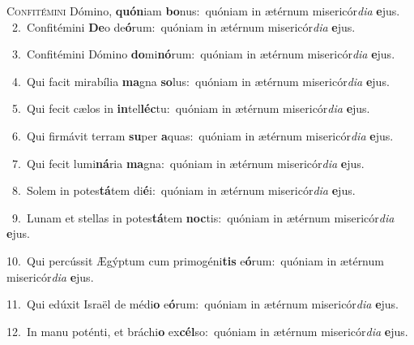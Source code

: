 \lettrine{\initial\textcolor{\initialcolor}{C}}{onfitémini} Dómino, \textbf{quón}\-iam \textbf{bo}\-nus:~\star quóniam in ætérnum misericór\-\textit{di}\-\textit{a} \textbf{e}\-jus.\\
{\numbfont\textcolor{\numbcolor}{~2.}}~Confitémini \textbf{De}\-o de\-\textbf{ó}\-rum:~\star quóniam in ætérnum misericór\-\textit{di}\-\textit{a} \textbf{e}\-jus.\par
{\numbfont\textcolor{\numbcolor}{~3.}}~Confitémini Dómino \textbf{do}\-mi\-\textbf{nó}\-rum:~\star quóniam in ætérnum misericór\-\textit{di}\-\textit{a} \textbf{e}\-jus.\par
{\numbfont\textcolor{\numbcolor}{~4.}}~Qui facit mirabília \textbf{ma}\-gna \textbf{so}\-lus:~\star quóniam in ætérnum misericór\-\textit{di}\-\textit{a} \textbf{e}\-jus.\par
{\numbfont\textcolor{\numbcolor}{~5.}}~Qui fecit cælos in \textbf{in}\-tel\-\textbf{léc}\-tu:~\star quóniam in ætérnum misericór\-\textit{di}\-\textit{a} \textbf{e}\-jus.\par
{\numbfont\textcolor{\numbcolor}{~6.}}~Qui firmávit terram \textbf{su}\-per \textbf{a}\-quas:~\star quóniam in ætérnum misericór\-\textit{di}\-\textit{a} \textbf{e}\-jus.\par
{\numbfont\textcolor{\numbcolor}{~7.}}~Qui fecit lumi\-\textbf{ná}\-ria \textbf{ma}\-gna:~\star quóniam in ætérnum misericór\-\textit{di}\-\textit{a} \textbf{e}\-jus.\par
{\numbfont\textcolor{\numbcolor}{~8.}}~Solem in potes\-\textbf{tá}\-tem di\-\textbf{é}\-i:~\star quóniam in ætérnum misericór\-\textit{di}\-\textit{a} \textbf{e}\-jus.\par
{\numbfont\textcolor{\numbcolor}{~9.}}~Lunam et stellas in potes\-\textbf{tá}\-tem \textbf{noc}\-tis:~\star quóniam in ætérnum misericór\-\textit{di}\-\textit{a} \textbf{e}\-jus.\par
{\numbfont\textcolor{\numbcolor}{10.}}~Qui percússit Ægýptum cum primogéni\textbf{tis} e\-\textbf{ó}\-rum:~\star quóniam in ætérnum misericór\-\textit{di}\-\textit{a} \textbf{e}\-jus.\par
{\numbfont\textcolor{\numbcolor}{11.}}~Qui edúxit Israël de médi\textbf{o} e\-\textbf{ó}\-rum:~\star quóniam in ætérnum misericór\-\textit{di}\-\textit{a} \textbf{e}\-jus.\par
{\numbfont\textcolor{\numbcolor}{12.}}~In manu poténti, et bráchi\textbf{o} ex\-\textbf{cél}\-so:~\star quóniam in ætérnum misericór\-\textit{di}\-\textit{a} \textbf{e}\-jus.\par
